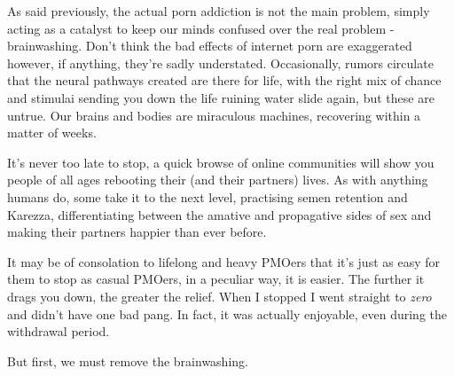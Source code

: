 \documentclass[easypeasy.tex]{subfiles}
\begin{document}
As said previously, the actual porn addiction is not the main problem, simply acting as a catalyst to keep our minds confused over the real problem - brainwashing. Don't think the bad effects of internet porn are exaggerated however, if anything, they're sadly understated. Occasionally, rumors circulate that the neural pathways created are there for life, with the right mix of chance and stimulai sending you down the life ruining water slide again, but these are untrue. Our brains and bodies are miraculous machines, recovering within a matter of weeks.

It's never too late to stop, a quick browse of online communities will show you people of all ages rebooting their (and their partners) lives. As with anything humans do, some take it to the next level, practising semen retention and Karezza, differentiating between the amative and propagative sides of sex and making their partners happier than ever before.

It may be of consolation to lifelong and heavy PMOers that it's just as easy for them to stop as casual PMOers, in a peculiar way, it is easier. The further it drags you down, the greater the relief. When I stopped I went straight to \textit{zero} and didn't have one bad pang. In fact, it was actually enjoyable, even during the withdrawal period.

But first, we must remove the brainwashing.
\end{document}
